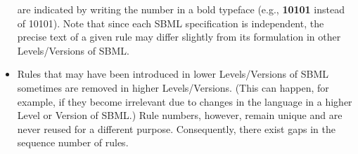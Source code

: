 \begin{itemize}
 are
  indicated by writing the number in a bold typeface (e.g.,
  \textbf{10101} instead of 10101).  Note that since each SBML
  specification is independent, the precise text of a given rule
  may differ slightly from its formulation in other
  Levels/Versions of SBML.

\item Rules that may have been introduced in lower Levels/Versions
  of SBML sometimes are removed in higher Levels/Versions.  (This
  can happen, for example, if they become irrelevant due to
  changes in the language in a higher Level or Version of SBML.)
  Rule numbers, however, remain unique and are never reused for a
  different purpose.  Consequently, there exist gaps in the
  sequence number of rules.

\end{itemize}


